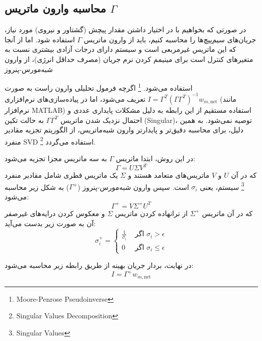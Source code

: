 	\subsection{محاسبه وارون ماتریس $\Gamma$}
	\label{subsec:method-pinv}
	در صورتی که بخواهیم با در اختیار داشتن مقدار پیچش (گشتاور و نیروی) مورد نیاز، جریان‌های سیم‌پیچ‌ها را محاسبه کنیم، باید از وارون ماتریس $\Gamma$ استفاده شود. اما از آنجا که این ماتریس غیرمربعی است و سیستم دارای درجات آزادی بیشتری نسبت به متغیرهای کنترل است  برای مینیمم کردن نرم جریان (مصرف حداقل انرژی)، از وارون شبه‌مورس-پنروز 
	
	استفاده می‌شود.
	\footnote{Moore-Penrose Pseudoinverse}
	اگرچه فرمول تحلیلی وارون راست به صورت $I = \Gamma^T (\Gamma \Gamma^T)^{-1} w_{m,\text{net}}$ تعریف می‌شود، اما در پیاده‌سازی‌های نرم‌افزاری (مانند نرم‌افزار MATLAB) استفاده مستقیم از این رابطه به دلیل مشکلات پایداری عددی و احتمال نزدیک شدن ماتریس $\Gamma \Gamma^T$ به حالت تکین (Singular)، توصیه نمی‌شود. به همین دلیل، برای محاسبه دقیق‌تر و پایدارتر وارون شبه‌ماتریس، از الگوریتم تجزیه مقادیر منفرد SVD
	\footnote{
		Singular Values Decomposition}
	استفاده می‌گردد.
	
	در این روش، ابتدا ماتریس $\Gamma$ به سه ماتریس مجزا تجزیه می‌شود:
	\begin{equation}
		\Gamma = U \Sigma V^T
		\label{eq:method-svd}
	\end{equation}
	که در آن $U$ و $V$ ماتریس‌های متعامد هستند و $\Sigma$ یک ماتریس قطری شامل مقادیر منفرد \footnote{Singular Values} سیستم، یعنی $\sigma_i$ است. سپس وارون شبه‌مورس-پنروز ($\Gamma^+$) به شکل زیر محاسبه می‌شود:
	\begin{equation}
		\Gamma^+ = V \Sigma^+ U^T
		\label{eq:method-pseudoinverse-svd}
	\end{equation}
	که در آن ماتریس $\Sigma^+$ از ترانهاده کردن ماتریس $\Sigma$ و معکوس کردن درایه‌های غیرصفر آن به صورت زیر بدست می‌آید:
	\begin{equation}
		\sigma^+_i = 
		\begin{cases} 
			\frac{1}{\sigma_i} & \text{ اگر } \sigma_i > \epsilon \\ 
			0 & \text{ اگر } \sigma_i \leq \epsilon 
		\end{cases}
		\label{eq:method-sigma-pinv}
	\end{equation}
	
	در نهایت، بردار جریان بهینه از طریق رابطه زیر محاسبه می‌شود:
	\begin{equation}
		I = \Gamma^+ w_{m,\text{net}}
		\label{eq:method-optimal-current}
	\end{equation}
	
